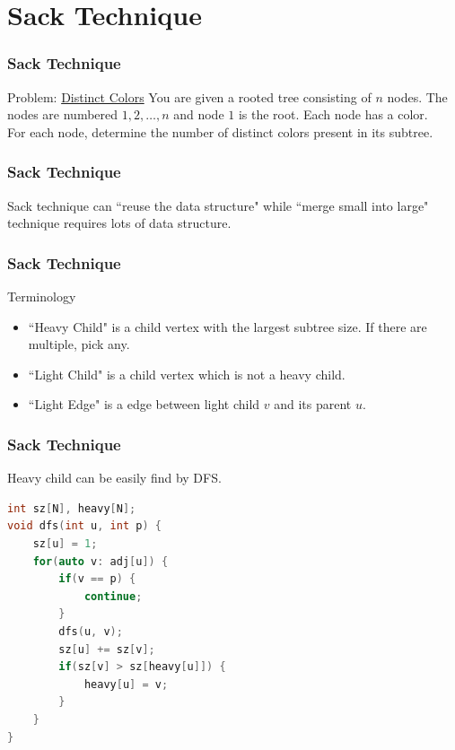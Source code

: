 \section{Sack Technique}

\begin{frame}
\frametitle{Sack Technique}
\begin{block}{Problem: \href{https://cses.fi/problemset/task/1139}{Distinct Colors}}
You are given a rooted tree consisting of $n$ nodes. The nodes are numbered $1, 2, \ldots, n$ and node $1$ is the root. Each node has a color.\\
For each node, determine the number of distinct colors present in its subtree.
\end{block}
\end{frame}

\begin{frame}
\frametitle{Sack Technique}  
Sack technique can ``reuse the data structure" while ``merge small into large" technique requires lots of data structure.
\end{frame}

\begin{frame}
\frametitle{Sack Technique}  
\Large Terminology

\normalsize
\begin{itemize}
    \item ``Heavy Child" is a child vertex with the largest subtree size. If there are multiple, pick any.
    \item ``Light Child" is a child vertex which is not a heavy child.
    \item ``Light Edge" is a edge between light child $v$ and its parent $u$.
\end{itemize}
\end{frame}

\begin{frame}[fragile]
\frametitle{Sack Technique}  
Heavy child can be easily find by DFS.

\begin{lstlisting}[language=C++, basicstyle=\small]
int sz[N], heavy[N];
void dfs(int u, int p) {
    sz[u] = 1;
    for(auto v: adj[u]) {
        if(v == p) {
            continue;
        }
        dfs(u, v);
        sz[u] += sz[v];
        if(sz[v] > sz[heavy[u]]) {
            heavy[u] = v;
        }
    }
}
\end{lstlisting}
\end{frame}

